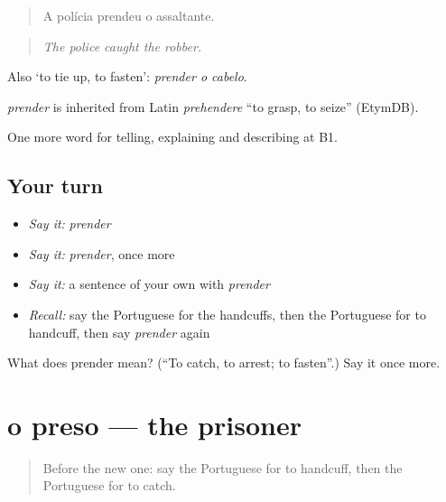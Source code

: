 \begin{quote}
A polícia prendeu o assaltante.
\end{quote}

\begin{quote}
\emph{The police caught the robber.}
\end{quote}

Also ‘to tie up, to fasten’: \emph{prender o cabelo}.

\begin{cousinweb}
\emph{prender} is inherited from Latin \emph{prehendere} \textquotedblleft{}to grasp, to seize\textquotedblright{} (EtymDB).
\end{cousinweb}

\begin{grammarlens}[title={What you've built}]
One more word for telling, explaining and describing at B1.
\end{grammarlens}

\subsection*{Your turn}
\begin{itemize}
\raggedright
  \item \emph{Say it:} \emph{prender}
  \item \emph{Say it:} \emph{prender}, once more
  \item \emph{Say it:} a sentence of your own with \emph{prender}
  \item \emph{Recall:} say the Portuguese for the handcuffs, then the Portuguese for to handcuff, then say \emph{prender} again
\end{itemize}

\begin{tcolorbox}[breakable,colback=teal!4,colframe=teal!35!black,title={Before you move on}]
What does prender mean? (\textquotedblleft{}To catch, to arrest; to fasten\textquotedblright{}.) Say it once more.
\end{tcolorbox}
\section[o preso]{o preso — the prisoner}

\label{lesson:PT-C296-preso}



\begin{quote}
Before the new one: say the Portuguese for to handcuff, then the Portuguese for to catch.
\end{quote}

